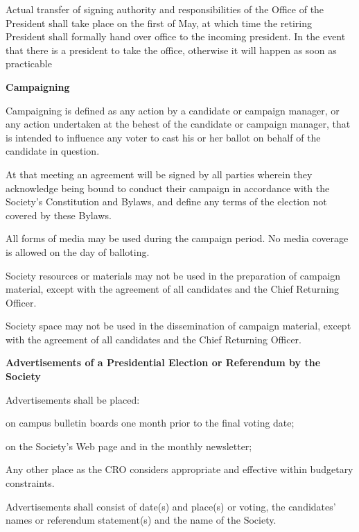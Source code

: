 \begin{longenum}[label*=\arabic*., align=left]
\begin{longenum}[label*=\arabic*., align=left]
  \item Actual transfer of signing authority and responsibilities of the Office of the President shall take place on the first of May, at which time the retiring President shall formally hand over office to the incoming president. In the event that there is a president to take the office, otherwise it will happen as soon as practicable
  
 \end{longenum}
 \item \textbf{Campaigning}
  \begin{longenum}[label*=\arabic*., align=left]
 
 \item Campaigning is defined as any action by a candidate or campaign manager, or any action undertaken at the behest of the candidate or campaign manager, that is intended to influence any voter to cast his or her ballot on behalf of the candidate in question.
\item At that meeting an agreement will be signed by all parties wherein they acknowledge being bound to conduct their campaign in accordance with the Society’s Constitution and Bylaws, and define any terms of the election not covered by these Bylaws.
\item All  forms of media may be used during  the campaign period. No media coverage is allowed on  the day of balloting.
\item  Society resources or materials may not be used in the preparation of campaign material, except with the agreement of all candidates and the Chief Returning Officer.
\item Society space may not be used in the dissemination of campaign material, except with the agreement of all candidates and the Chief Returning Officer.
 \end{longenum}
 \item 	\textbf{Advertisements	of	a	Presidential	Election	or	Referendum	by	the	Society }
  \begin{longenum}[label*=\arabic*., align=left]
  \item Advertisements shall be placed:
 \begin{longenum}[label*=\arabic*., align=left]
\item on campus bulletin boards one month prior to the final voting date;
\item on the Society’s Web page and in the monthly newsletter;
\item Any other place as the CRO considers appropriate and effective within budgetary 
constraints.
 \end{longenum}
\item Advertisements shall consist of date(s) and place(s) or voting, the candidates’ names or referendum 
statement(s) and the name of the Society. 
 \end{longenum}
  

\end{longenum}
